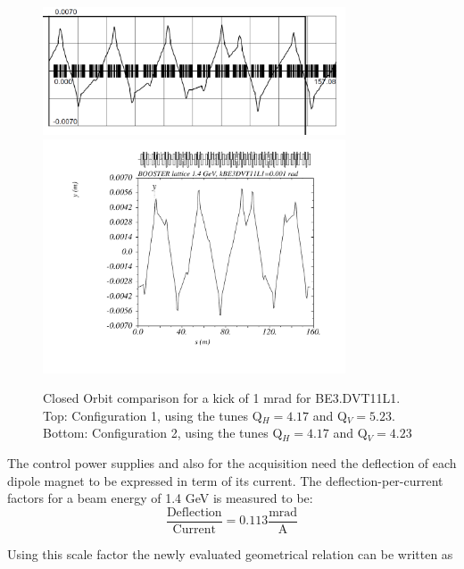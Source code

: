 \documentclass[11pt,letter,english]{article}
\begin{document}
\begin{figure}[!hbtp]
  \begin{center}
    \includegraphics[width=0.8\textwidth]{figs/LINC-BE_DVT11L1.png}
    \includegraphics[width=0.8\textwidth]{figs/psb_orbit_kBE3DVT11L1at0p001rad_l2014tobias.pdf}
    \caption{Closed Orbit comparison for a kick of 1 mrad for BE3.DVT11L1. Top: Configuration 1, using the tunes Q$_H=4.17$ and Q$_V=5.23$. Bottom: Configuration 2, using the tunes Q$_H=4.17$ and Q$_V=4.23$}
    \label{fig:BE_DVT11L1}
  \end{center}
\end{figure}

\clearpage

The control power supplies and also for the acquisition need the deflection of
each dipole magnet to be expressed in term of its current.
The deflection-per-current factors for a beam energy of 1.4 GeV is measured to be:
\begin{equation}
\frac{\mbox{Deflection}}{\mbox{Current}} = 0.113 \frac{\mbox{mrad}}{\mbox{A}}
\end{equation}

Using this scale factor the newly evaluated geometrical relation can be written as 
\end{document}
